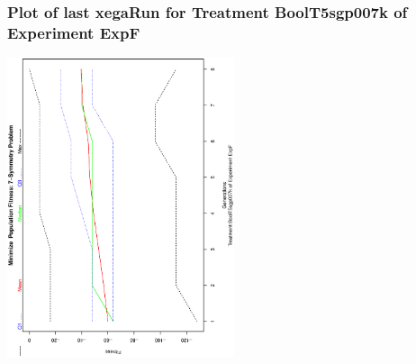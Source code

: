  \begin{frame}
 \frametitle{ Plot of last xegaRun for Treatment BoolT5sgp007k of Experiment ExpF }
 \begin{center}
\includegraphics[width=0.5\textwidth, angle=-90]
{ExpFPlotPopStatsFigure005.eps}
 \end{center}
 \label{templateReport/ExpFPlotPopStatsFigure005.eps}  
 \end{frame}

